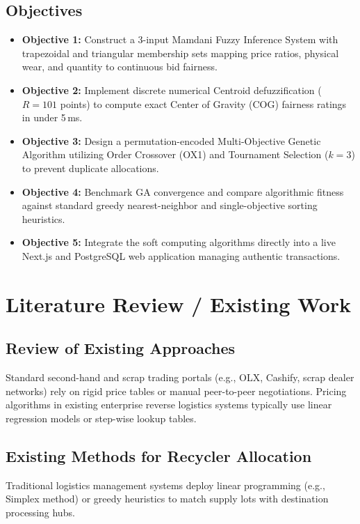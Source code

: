 \documentclass[12pt,a4paper]{article}
\begin{document}
\subsection{Objectives}
\begin{itemize}
    \item \textbf{Objective 1:} Construct a 3-input Mamdani Fuzzy Inference System with trapezoidal and triangular membership sets mapping price ratios, physical wear, and quantity to continuous bid fairness.
    \item \textbf{Objective 2:} Implement discrete numerical Centroid defuzzification ($R=101$ points) to compute exact Center of Gravity (COG) fairness ratings in under 5\,ms.
    \item \textbf{Objective 3:} Design a permutation-encoded Multi-Objective Genetic Algorithm utilizing Order Crossover (OX1) and Tournament Selection ($k=3$) to prevent duplicate allocations.
    \item \textbf{Objective 4:} Benchmark GA convergence and compare algorithmic fitness against standard greedy nearest-neighbor and single-objective sorting heuristics.
    \item \textbf{Objective 5:} Integrate the soft computing algorithms directly into a live Next.js and PostgreSQL web application managing authentic transactions.
\end{itemize}

\section{Literature Review / Existing Work}

\subsection{Review of Existing Approaches}
Standard second-hand and scrap trading portals (e.g., OLX, Cashify, scrap dealer networks) rely on rigid price tables or manual peer-to-peer negotiations. Pricing algorithms in existing enterprise reverse logistics systems typically use linear regression models or step-wise lookup tables.

\subsection{Existing Methods for Recycler Allocation}
Traditional logistics management systems deploy linear programming (e.g., Simplex method) or greedy heuristics to match supply lots with destination processing hubs. 
\end{document}
